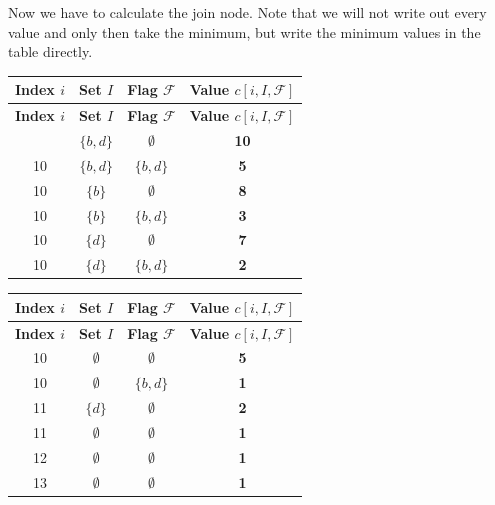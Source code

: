 Now we have to calculate the join node. Note that we will not write out every value and only 
then take the minimum, but write the minimum values in the table directly.

\begin{minipage}[t]{0.48\textwidth} %
    \centering
    \begin{longtable}{|c|c|c|c|}
        \hline
        \textbf{Index $i$} & \textbf{Set $I$} & \textbf{Flag $\mathcal{F}$} & \textbf{Value $c[i, I, \mathcal{F}]$} \\
        \hline
        \endfirsthead
        \hline
        \textbf{Index $i$} & \textbf{Set $I$} & \textbf{Flag $\mathcal{F}$} & \textbf{Value $c[i, I, \mathcal{F}]$} \\
        \hline
        \endhead
        \hline
        \endfoot

        \hline
        10 & $\{b,d\}$ & $\emptyset$ & \textbf{10} \\
        10 & $\{b,d\}$ & $\{b,d\}$ & \textbf{5} \\
        10 & $\{b\}$ & $\emptyset$ & \textbf{8} \\
        10 & $\{b\}$ & $\{b,d\}$ & \textbf{3} \\
        10 & $\{d\}$ & $\emptyset$ & \textbf{7} \\
        10 & $\{d\}$ & $\{b,d\}$ & \textbf{2} \\

        \hline
    \end{longtable}
\end{minipage}%
\hfill
\begin{minipage}[t]{0.48\textwidth} %
    \centering
    \begin{longtable}{|c|c|c|c|}
        \hline
        \textbf{Index $i$} & \textbf{Set $I$} & \textbf{Flag $\mathcal{F}$} & \textbf{Value $c[i, I, \mathcal{F}]$} \\
        \hline
        \endfirsthead
        \hline
        \textbf{Index $i$} & \textbf{Set $I$} & \textbf{Flag $\mathcal{F}$} & \textbf{Value $c[i, I, \mathcal{F}]$} \\
        \hline
        \endhead
        \hline
        \endfoot

        10 & $\emptyset$ & $\emptyset$ & \textbf{5} \\
        10 & $\emptyset$ & $\{b,d\}$ & \textbf{1} \\
        \hline
        11 & $\{d\}$ & $\emptyset$ & \textbf{2} \\
        11 & $\emptyset$ & $\emptyset$ & \textbf{1} \\
        \hline
        12 & $\emptyset$ & $\emptyset$ & \textbf{1} \\
        \hline
        13 & $\emptyset$ & $\emptyset$ & \textbf{1} \\
        \hline
        
    \end{longtable}
\end{minipage}

